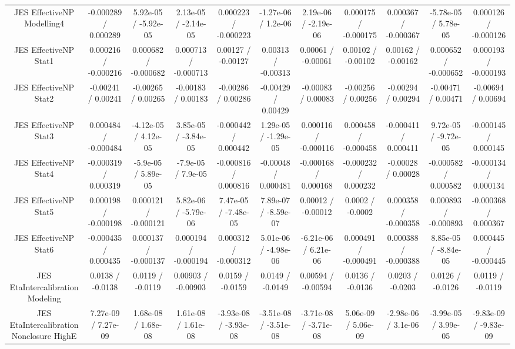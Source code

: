 \begin{table}[htbp]
\begin{center}
\begin{tabular}{|c|c|c|c|c|c|c|c|c|c|c|}
  JES EffectiveNP Modelling4 & -0.000289 / 0.000289 & 5.92e-05 / -5.92e-05 & 2.13e-05 / -2.14e-05 & 0.000223 / -0.000223 & -1.27e-06 / 1.2e-06 & 2.19e-06 / -2.19e-06 & 0.000175 / -0.000175 & 0.000367 / -0.000367 & -5.78e-05 / 5.78e-05 & 0.000126 / -0.000126 \\ 
  JES EffectiveNP Stat1 & 0.000216 / -0.000216 & 0.000682 / -0.000682 & 0.000713 / -0.000713 & 0.00127 / -0.00127 & 0.00313 / -0.00313 & 0.00061 / -0.00061 & 0.00102 / -0.00102 & 0.00162 / -0.00162 & 0.000652 / -0.000652 & 0.000193 / -0.000193 \\ 
  JES EffectiveNP Stat2 & -0.00241 / 0.00241 & -0.00265 / 0.00265 & -0.00183 / 0.00183 & -0.00286 / 0.00286 & -0.00429 / 0.00429 & -0.00083 / 0.00083 & -0.00256 / 0.00256 & -0.00294 / 0.00294 & -0.00471 / 0.00471 & -0.00694 / 0.00694 \\ 
  JES EffectiveNP Stat3 & 0.000484 / -0.000484 & -4.12e-05 / 4.12e-05 & 3.85e-05 / -3.84e-05 & -0.000442 / 0.000442 & 1.29e-05 / -1.29e-05 & 0.000116 / -0.000116 & 0.000458 / -0.000458 & -0.000411 / 0.000411 & 9.72e-05 / -9.72e-05 & -0.000145 / 0.000145 \\ 
  JES EffectiveNP Stat4 & -0.000319 / 0.000319 & -5.9e-05 / 5.89e-05 & -7.9e-05 / 7.9e-05 & -0.000816 / 0.000816 & -0.00048 / 0.000481 & -0.000168 / 0.000168 & -0.000232 / 0.000232 & -0.00028 / 0.00028 & -0.000582 / 0.000582 & -0.000134 / 0.000134 \\ 
  JES EffectiveNP Stat5 & 0.000198 / -0.000198 & 0.000121 / -0.000121 & 5.82e-06 / -5.79e-06 & 7.47e-05 / -7.48e-05 & 7.89e-07 / -8.59e-07 & 0.00012 / -0.00012 & 0.0002 / -0.0002 & 0.000358 / -0.000358 & 0.000893 / -0.000893 & -0.000368 / 0.000367 \\ 
  JES EffectiveNP Stat6 & -0.000435 / 0.000435 & 0.000137 / -0.000137 & 0.000194 / -0.000194 & 0.000312 / -0.000312 & 5.01e-06 / -4.98e-06 & -6.21e-06 / 6.21e-06 & 0.000491 / -0.000491 & 0.000388 / -0.000388 & 8.85e-05 / -8.84e-05 & 0.000445 / -0.000445 \\ 
  JES EtaIntercalibration Modeling & 0.0138 / -0.0138 & 0.0119 / -0.0119 & 0.00903 / -0.00903 & 0.0159 / -0.0159 & 0.0149 / -0.0149 & 0.00594 / -0.00594 & 0.0136 / -0.0136 & 0.0203 / -0.0203 & 0.0126 / -0.0126 & 0.0119 / -0.0119 \\ 
  JES EtaIntercalibration Nonclosure HighE & 7.27e-09 / 7.27e-09 & 1.68e-08 / 1.68e-08 & 1.61e-08 / 1.61e-08 & -3.93e-08 / -3.93e-08 & -3.51e-08 / -3.51e-08 & -3.71e-08 / -3.71e-08 & 5.06e-09 / 5.06e-09 & -2.98e-06 / 3.1e-06 & -3.99e-05 / 3.99e-05 & -9.83e-09 / -9.83e-09 \\ 

\end{tabular}
\end{center}
\end{table}
